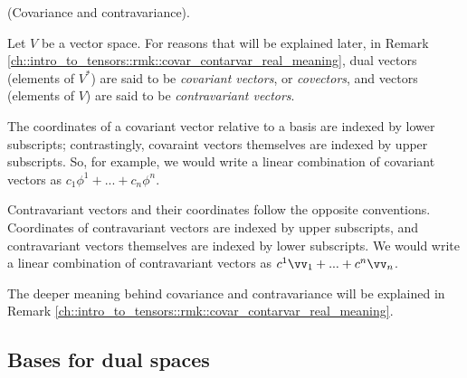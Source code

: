 \begin{defn}
\label{ch::motivated_intro::defn::covariance_contravariance}
    (Covariance and contravariance).
    
    Let $V$ be a vector space. For reasons that will be explained later, in Remark \ref{ch::intro_to_tensors::rmk::covar_contarvar_real_meaning}, dual vectors (elements of $V^*$) are said to be \textit{covariant vectors}, or \textit{covectors}, and vectors (elements of $V$) are said to be \textit{contravariant vectors}.
    
    The coordinates of a covariant vector relative to a basis are indexed by lower subscripts; contrastingly, covaraint vectors themselves are indexed by upper subscripts. So, for example, we would write a linear combination of covariant vectors as $c_1 \phi^1 + ... + c_n \phi^n$.
    
    Contravariant vectors and their coordinates follow the opposite conventions. Coordinates of contravariant vectors are indexed by upper subscripts, and contravariant vectors themselves are indexed by lower subscripts. We would write a linear combination of contravariant vectors as $c^1 \vv_1 + ... + c^n \vv_n$.
    
    The deeper meaning behind covariance and contravariance will be explained in Remark \ref{ch::intro_to_tensors::rmk::covar_contarvar_real_meaning}.
\end{defn}

\subsection*{Bases for dual spaces}

